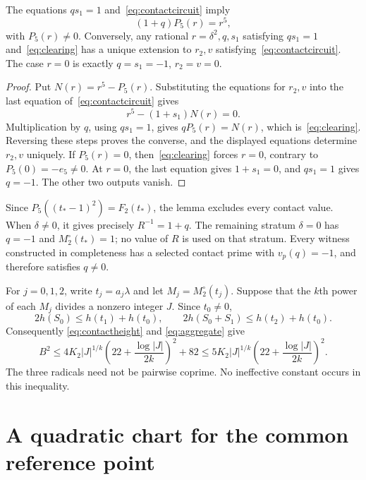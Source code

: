 \documentclass[11pt,a4paper]{article}
\begin{document}
\begin{lemma}\label{lem:contactcircuit}
The equations $qs_1=1$ and~\eqref{eq:contactcircuit} imply
\begin{equation}\label{eq:clearing}
                       (1+q)P_5(r)=r^5,
\end{equation}
with $P_5(r)\ne0$. Conversely, any rational $r=\delta^2,q,s_1$
satisfying $qs_1=1$ and~\eqref{eq:clearing} has a unique extension
to $r_2,v$ satisfying~\eqref{eq:contactcircuit}. The case
$r=0$ is exactly $q=s_1=-1$, $r_2=v=0$.
\end{lemma}
\begin{proof}
Put $N(r)=r^5-P_5(r)$. Substituting the equations for $r_2,v$
into the last equation of~\eqref{eq:contactcircuit} gives
\[
                       r^5-(1+s_1)N(r)=0.
\]
Multiplication by $q$, using $qs_1=1$, gives $qP_5(r)=N(r)$,
which is~\eqref{eq:clearing}. Reversing these steps proves the
converse, and the displayed equations determine $r_2,v$ uniquely.
If $P_5(r)=0$, then~\eqref{eq:clearing} forces $r=0$,
contrary to $P_5(0)=-e_5\ne0$. At $r=0$, the last equation gives
$1+s_1=0$, and $qs_1=1$ gives $q=-1$. The other two outputs vanish.
\end{proof}

Since $P_5((t_*-1)^2)=F_2(t_*)$, the lemma excludes every contact
value. When $\delta\ne0$, it gives precisely $R^{-1}=1+q$.
The remaining stratum $\delta=0$ has $q=-1$ and
$M_2^\circ(t_*)=1$; no value of $R$ is used on that stratum.
Every witness constructed in completeness has a selected contact prime
with $v_p(q)=-1$, and therefore satisfies $q\ne0$.

For $j=0,1,2$, write $t_j=a_j\lambda$ and let $M_j=M_2^\circ(t_j)$.
Suppose that the $k$th power of each $M_j$ divides a nonzero integer
$J$. Since $t_0\ne0$,
\[
 2h(S_0)\le h(t_1)+h(t_0),\qquad
 2h(S_0+S_1)\le h(t_2)+h(t_0).
\]
Consequently \eqref{eq:contactheight} and \eqref{eq:aggregate} give
\begin{equation}\label{eq:heighttransfer}
 B^2\le4K_2|J|^{1/k}
           \left(22+\frac{\log|J|}{2k}\right)^2+82
 \le5K_2|J|^{1/k}\left(22+\frac{\log|J|}{2k}\right)^2.
\end{equation}
The three radicals need not be pairwise coprime. No ineffective
constant occurs in this inequality.

\section{A quadratic chart for the common reference point}
\end{document}
